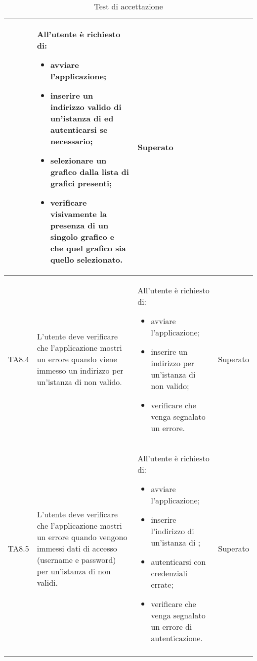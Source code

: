 \begin{longtabu}{| X[0.5] | X | X | X[0.5] |}
		& All'utente è richiesto di:
		\begin{itemize}
			\item avviare l'applicazione;
			\item inserire un indirizzo valido di un'istanza di \projectname{} ed autenticarsi se necessario;
			\item selezionare un grafico dalla lista di grafici presenti;
			\item verificare visivamente la presenza di un singolo grafico e che quel grafico sia quello selezionato.
		\end{itemize}
& Superato \\ \hline

	TA8.4 & L'utente deve verificare che l'applicazione  mostri un errore quando viene immesso un indirizzo per un'istanza di \projectname{} non valido.

		& All'utente è richiesto di:
		\begin{itemize}
			\item avviare l'applicazione;
			\item inserire un indirizzo per un'istanza di \projectname{} non valido;
			\item verificare che venga segnalato un errore.
		\end{itemize}
& Superato \\ \hline

	TA8.5 & L'utente deve verificare che l'applicazione  mostri un errore quando vengono immessi dati di accesso (username e password) per un'istanza di \projectname{} non validi.

		& All'utente è richiesto di:
		\begin{itemize}
			\item avviare l'applicazione;
			\item inserire l'indirizzo di un'istanza di \projectname{};
			\item autenticarsi con credenziali errate;
			\item verificare che venga segnalato un errore di autenticazione.
		\end{itemize}
& Superato \\ \hline

\caption{Test di accettazione}

\end{longtabu}
